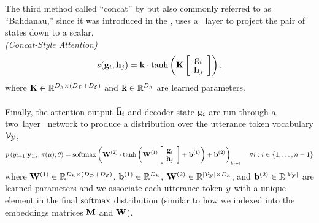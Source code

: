 The third method called ``concat'' by \citet{luong2015} but also commonly
referred to as ``Bahdanau,'' since it was introduced in the 
\citet{bahdanau2015}, uses a \feedforward~layer to project the pair of states
down to a scalar,\\
\textit{(Concat-Style Attention)}
\[ s(\mathbf{g}_i, \mathbf{h}_j) = \mathbf{k}\cdot\tanh\left(\mathbf{K}\left[ \begin{array}{c} \mathbf{g}_i \\ \mathbf{h}_j \end{array} \right] \right),  \]
    where $\mathbf{K} \in \mathbb{R}^{D_{h} \times ({D_\mathcal{D}} + {D_\mathcal{E}})}$
    and $\mathbf{k} \in \mathbb{R}^{D_{h}}$ are learned parameters.



\paragraph{}
Finally, the attention output ${\boldsymbol{\bar{\mathbf{h}}}}_i$ and decoder state $\mathbf{g}_i$
are run through a two~layer \feedforward~network to produce a distribution
over the utterance token vocabulary $\mathcal{V}_{\mathcal{Y}}$,
\[ p\left(y_{i+1}|\mathbf{y}_{1:i},\pi(\mu);\theta\right) = \operatorname*{softmax}\left(   \mathbf{W}^{(2)}\cdot \tanh\left(\mathbf{W}^{(1)} \left[ \begin{array}{c}\mathbf{g}_i \\ \mathbf{h}_j \end{array} \right] + \mathbf{b}^{(1)}\right) + \mathbf{b}^{(2)} \right)_{y_{i+1}}\quad \forall i: i \in \{1,\ldots,n-1\} \]
    where $\mathbf{W}^{(1)} \in \mathbb{R}^{D_{h} \times \left({D_\mathcal{D}} + {D_\mathcal{E}}\right)}$,
    $\mathbf{b}^{(1)} \in \mathbb{R}^{D_{h}}$, $\mathbf{W}^{(2)} \in \mathbb{R}^{{\left\vert \mathcal{V}_{\mathcal{Y}} \right\vert} \times D_{h}}$, and $\mathbf{b}^{(2)}\in\mathbb{R}^{{\left\vert \mathcal{V}_{\mathcal{Y}} \right\vert}}$ are learned
    parameters and we associate each utterance token $y$ with a unique 
    element in the final $\operatorname*{softmax}$ distribution (similar to how we indexed
    into the embeddings matrices $\mathbf{M}$ and $\mathbf{W}$). 



% 
